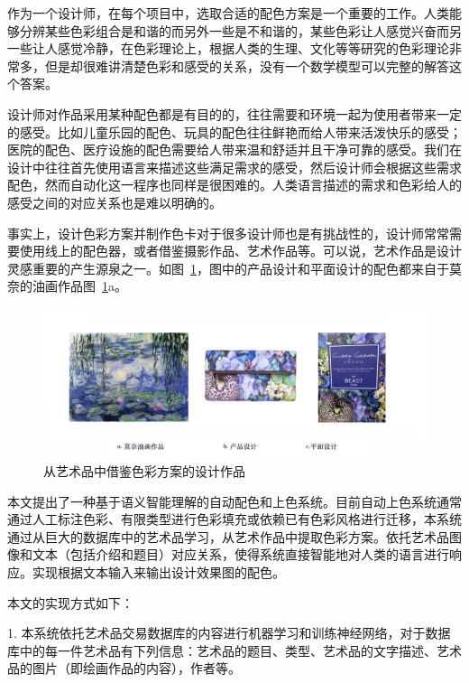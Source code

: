 作为一个设计师，在每个项目中，选取合适的配色方案是一个重要的工作。人类能够分辨某些色彩组合是和谐的而另外一些是不和谐的，某些色彩让人感觉兴奋而另一些让人感觉冷静，在色彩理论上，根据人类的生理、文化等等研究的色彩理论非常多，但是却很难讲清楚色彩和感受的关系，没有一个数学模型可以完整的解答这个答案。

设计师对作品采用某种配色都是有目的的，往往需要和环境一起为使用者带来一定的感受。比如儿童乐园的配色、玩具的配色往往鲜艳而给人带来活泼快乐的感受；医院的配色、医疗设施的配色需要给人带来温和舒适并且干净可靠的感受。我们在设计中往往首先使用语言来描述这些满足需求的感受，然后设计师会根据这些需求配色，然而自动化这一程序也同样是很困难的。人类语言描述的需求和色彩给人的感受之间的对应关系也是难以明确的。

事实上，设计色彩方案并制作色卡对于很多设计师也是有挑战性的，设计师常常需要使用线上的配色器，或者借鉴摄影作品、艺术作品等。可以说，艺术作品是设计灵感重要的产生源泉之一。如图~\ref{figure:从艺术品中借鉴色彩方案的设计作品}，图中的产品设计和平面设计的配色都来自于莫奈的油画作品图~\ref{figure:从艺术品中借鉴色彩方案的设计作品}a。

\begin{figure}[!htbp]
\centering
\includegraphics[width=\linewidth,keepaspectratio]{data/chapter-1/借鉴艺术品的设计.jpg}
\caption{从艺术品中借鉴色彩方案的设计作品}
\label{figure:从艺术品中借鉴色彩方案的设计作品}
\end{figure}

本文提出了一种基于语义智能理解的自动配色和上色系统。目前自动上色系统通常通过人工标注色彩、有限类型进行色彩填充或依赖已有色彩风格进行迁移，本系统通过从巨大的数据库中的艺术品学习，从艺术作品中提取色彩方案。依托艺术品图像和文本（包括介绍和题目）对应关系，使得系统直接智能地对人类的语言进行响应。实现根据文本输入来输出设计效果图的配色。

本文的实现方式如下：

1. 本系统依托艺术品交易数据库的内容进行机器学习和训练神经网络，对于数据库中的每一件艺术品有下列信息：艺术品的题目、类型、艺术品的文字描述、艺术品的图片（即绘画作品的内容），作者等。

